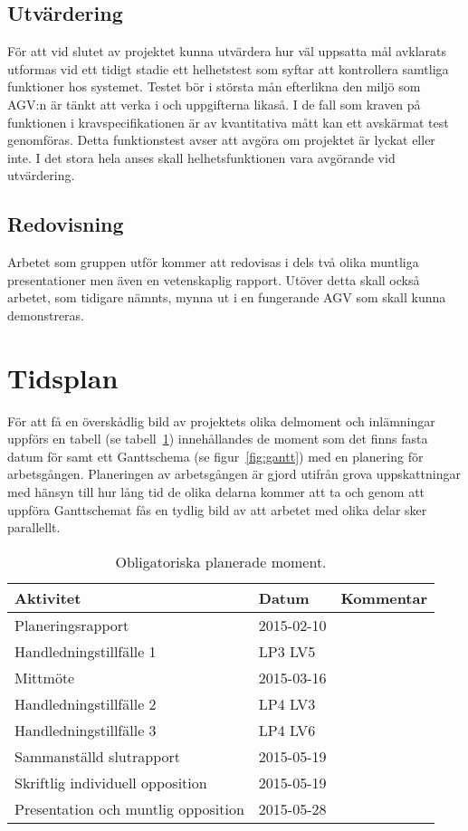 \documentclass[a4paper,11pt]{article}
\begin{document}
\subsection{Utvärdering}
För att vid slutet av projektet kunna utvärdera hur väl uppsatta mål
avklarats utformas vid ett tidigt stadie ett helhetstest som syftar att
kontrollera samtliga funktioner hos systemet. Testet bör i största mån
efterlikna den miljö som AGV:n är tänkt att verka i och uppgifterna likaså.
I de fall som kraven på funktionen i kravspecifikationen är av kvantitativa
mått kan ett avskärmat test genomföras. Detta funktionstest avser att
avgöra om projektet är lyckat eller inte. I det stora hela anses skall
helhetsfunktionen vara avgörande vid utvärdering.

\subsection{Redovisning}
Arbetet som gruppen utför kommer att redovisas i dels två olika muntliga
presentationer men även en vetenskaplig rapport. Utöver detta skall också
arbetet, som tidigare nämnts, mynna ut i en fungerande AGV som skall kunna
demonstreras.



\section{Tidsplan}
För att få en överskådlig bild av projektets olika delmoment och
inlämningar uppförs en tabell (se tabell~\ref{tab:planeringstabell})
innehållandes de moment som det finns fasta datum för samt ett Ganttschema
(se figur~\ref{fig:gantt}) med en planering för arbetsgången. Planeringen
av arbetsgången är gjord utifrån grova uppskattningar med hänsyn till hur
lång tid de olika delarna kommer att ta och genom att uppföra Ganttschemat
fås en tydlig bild av att arbetet med olika delar sker parallellt.

\begin{table}[h]
  \begin{center}
    \begin{tabular}{l | l | l }
      Aktivitet                           & Datum      & Kommentar \\ \hline
      Planeringsrapport                   & 2015-02-10 & \\
      Handledningstillfälle 1             & LP3 LV5    & \\
      Mittmöte                            & 2015-03-16 & \\
      Handledningstillfälle 2             & LP4 LV3    & \\
      Handledningstillfälle 3             & LP4 LV6    & \\
      Sammanställd slutrapport            & 2015-05-19 & \\
      Skriftlig individuell opposition    & 2015-05-19 & \\
      Presentation och muntlig opposition & 2015-05-28 & \\
    \end{tabular}
  \end{center}
  \caption{Obligatoriska planerade moment.}
  \label{tab:planeringstabell}
\end{table}
\end{document}
